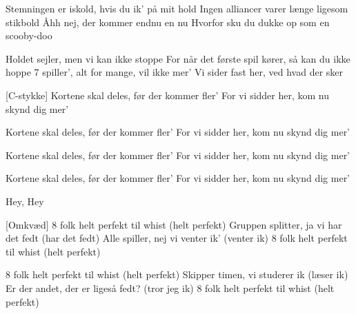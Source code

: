 \documentclass[a4paper,11pt]{article}
\begin{document}
\begin{song}
 Stemningen er iskold, hvis du ik' på mit hold
    Ingen alliancer varer længe ligesom stikbold
    Åhh nej, der kommer endnu en nu
    Hvorfor sku du dukke op som en scooby-doo


 Holdet sejler, men vi kan ikke stoppe
    For når det første spil kører, så kan du ikke hoppe
    7 spiller', alt for mange, vil ikke mer'
    Vi sider fast her, ved hvad der sker

[C-stykke] Kortene skal deles, før der kommer fler'
    For vi sidder her, kom nu skynd dig mer'

    Kortene skal deles, før der kommer fler'
    For vi sidder her, kom nu skynd dig mer'

    Kortene skal deles, før der kommer fler'
    For vi sidder her, kom nu skynd dig mer'

    Kortene skal deles, før der kommer fler'
    For vi sidder her, kom nu skynd dig mer'


 Hey, Hey

[Omkvæd] 8 folk helt perfekt til whist (helt perfekt)
    Gruppen splitter, ja vi har det fedt (har det fedt)
    Alle spiller, nej vi venter ik' (venter ik)
    8 folk helt perfekt til whist (helt perfekt)

 8 folk helt perfekt til whist (helt perfekt)
    Skipper timen, vi studerer ik (læser ik)
    Er der andet, der er ligeså fedt? (tror jeg ik)
    8 folk helt perfekt til whist (helt perfekt)

    
\end{song}
\end{document}
